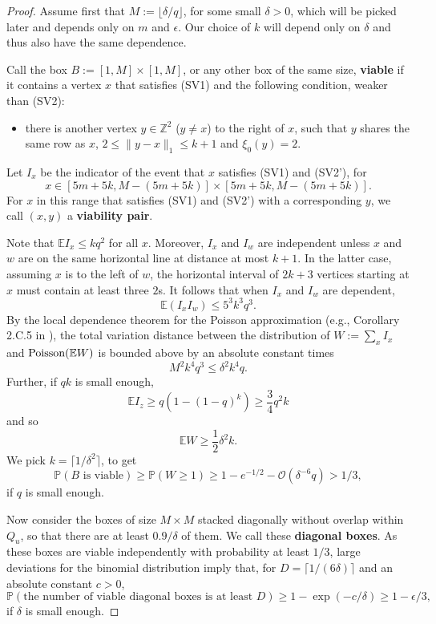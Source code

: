 \documentclass{article}
\renewcommand{\P}{\mathbb{P}}
\newcommand{\E}[0]{\mathbb{E}}
\newcommand{\bZ}{{\mathbb Z}}
\newcommand{\cO}{\mathcal O}
\numberwithin{equation}{section}
\begin{document}
\begin{proof}
Assume first that $M := \lfloor\delta/q\rfloor$, for some small  
$\delta>0$, which will be picked later and depends only on $m$ and $\epsilon$. Our choice of $k$ will depend only on $\delta$ and thus 
also have the same dependence.

Call the box $B := [1,M]\times [1,M]$, or any other box of the same size, {\bf viable\/} if it contains a vertex 
$x$ that satisfies (SV1) and the following condition, weaker than (SV2):
\begin{itemize}[leftmargin=1.25cm]
    \item [(SV2')]
    there is another vertex $y \in \bZ^2$ ($y \neq x$) to the right of $x$, such that $y$ shares the same row as $x$, $2\le\|y - x\|_1 \leq k + 1$ and $\xi_0(y) = 2$.
\end{itemize}

Let 
$I_x$ be the indicator of the event that $x$ satisfies (SV1) and (SV2'), 
for 
\[
x\in [5m + 5k, M-(5m + 5k)]\times[5m + 5k,M-(5m + 5k)].
\]
For $x$ in this range that satisfies (SV1) and (SV2')  with a corresponding $y$, we call $(x,y)$ a {\bf viability pair\/}.

Note that $\E I_x\le kq^2$ for all $x$. Moreover, $I_x$ and $I_w$
are independent unless $x$ and $w$ are on the same horizontal line at distance at most $k+1$. In the latter case, 
assuming $x$ is to the left of $w$, the horizontal interval of $2k+3$ vertices starting at $x$ must contain at least three $2$s. It follows that when $I_x$ and $I_w$
are dependent, 
$$
\E(I_xI_w)\le 5^3 k^3 q^3. 
$$
By the local dependence theorem for the Poisson approximation 
(e.g., Corollary 2.C.5 in \cite{BHJ1992}), 
the total variation distance between the distribution of $W := \sum_x I_x$ and $\text{\rm Poisson}(\E W)$ is bounded above by an absolute constant times
$$
M^2k^4q^3\le \delta^2 k^4 q.
$$
Further, if $qk$ is small enough, 
$$
\E I_z\ge q(1-(1-q)^k)\ge \frac 34 q^2 k
$$
and so 
$$
\E W\ge \frac 12 \delta^2k.
$$
We pick $k=\lceil 1/\delta^2\rceil$, to get 
$$
\P(B\text{ is viable})\ge \P (W\ge 1)\ge 1-e^{-1/2}-\cO(\delta^{-6}q)> 1/3,
$$
if $q$ is small enough. 

Now consider the boxes of size $M\times M$ stacked diagonally without overlap within
$Q_u$, so that there are at least $0.9/\delta$ of them. We call these 
{\bf diagonal boxes\/}. As these boxes 
are viable independently with probability at least $1/3$, 
large deviations for the binomial distribution imply that, for 
$D=\lceil 1/(6\delta)\rceil$ and an absolute constant $c>0$, 
\begin{equation}\label{eq:D-viable}
\P(\text{the
number of viable diagonal 
boxes is at least $D$})\ge 1-\exp(-c/\delta)\ge 1-\epsilon/3, 
\end{equation}
if $\delta$ is small enough.


\end{proof}
\end{document}
